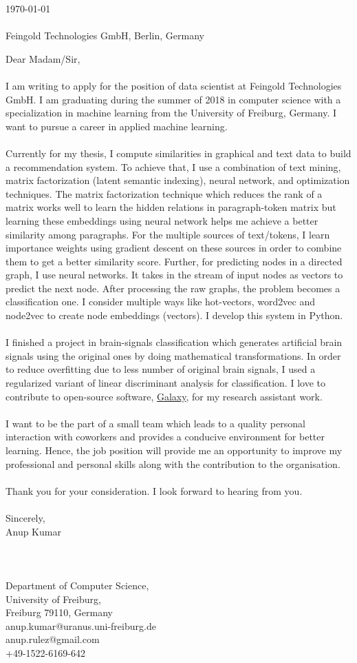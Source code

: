 \documentclass[a4paper]{article}
\begin{document}
\today \\
\\
Feingold Technologies GmbH, \newline
Berlin, \newline
Germany \newline

Dear Madam/Sir,
\\
\\
I am writing to apply for the position of data scientist at Feingold Technologies GmbH. I am graduating during the summer of 2018 in computer science with a specialization in machine learning from the University of Freiburg, Germany. I want to pursue a career in applied machine learning.
\\
\\
Currently for my thesis, I compute similarities in graphical and text data to build a recommendation system. To achieve that, I use a combination of text mining, matrix factorization (latent semantic indexing), neural network, and optimization techniques. The matrix factorization technique which reduces the rank of a matrix works well to learn the hidden relations in paragraph-token matrix but learning these embeddings using neural network helps me achieve a better similarity among paragraphs. For the multiple sources of text/tokens, I learn importance weights using gradient descent on these sources in order to combine them to get a better similarity score. Further, for predicting nodes in a directed graph, I use neural networks. It takes in the stream of input nodes as vectors to predict the next node. After processing the raw graphs, the problem becomes a classification one. I consider multiple ways like hot-vectors, word2vec and node2vec to create node embeddings (vectors). I develop this system in Python.
\\
\\
I finished a project in brain-signals classification which generates artificial brain signals using the original ones by doing mathematical transformations. In order to reduce overfitting due to less number of original brain signals, I used a regularized variant of linear discriminant analysis for classification. I love to contribute to open-source software, 
\href{https://usegalaxy.org/} {Galaxy}, for my research assistant work.
\\
\\
I want to be the part of a small team which leads to a quality personal interaction with coworkers and provides a conducive environment for better learning. Hence, the job position will provide me an opportunity to improve my professional and personal skills along with the contribution to the organisation.
\\
\\
Thank you for your consideration. I look forward to hearing from you.
\\
\\
Sincerely, \\
Anup Kumar \newline
\\
\\
\\
\\
Department of Computer Science, \\
University of Freiburg, \\
Freiburg 79110, Germany \\
anup.kumar@uranus.uni-freiburg.de\\
anup.rulez@gmail.com\\
+49-1522-6169-642\\
\end{document}
